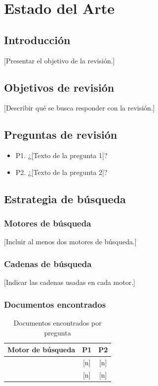 
\chapter{Estado del Arte}
\label{ch:state-of-art}

\section{Introducción}
[Presentar el objetivo de la revisión.]

\section{Objetivos de revisión}
[Describir qué se busca responder con la revisión.]

\section{Preguntas de revisión}
\begin{itemize}
  \item P1. ¿[Texto de la pregunta 1]?
  \item P2. ¿[Texto de la pregunta 2]?
\end{itemize}

\section{Estrategia de búsqueda}

\subsection{Motores de búsqueda}
[Incluir al menos dos motores de búsqueda.]

\subsection{Cadenas de búsqueda}
[Indicar las cadenas usadas en cada motor.]

\subsection{Documentos encontrados}

\begin{table}[H]
  \centering
  \caption{Documentos encontrados por pregunta}
  \label{tab:documents}
  \begin{tabular}{|l|c|c|}
    \hline
    \textbf{Motor de búsqueda} & \textbf{P1} & \textbf{P2} \\
    \hline
    [Motor 1] & [n] & [n] \\
    \hline
    [Motor 2] & [n] & [n] \\
    \hline
  \end{tabular}
\end{table}

